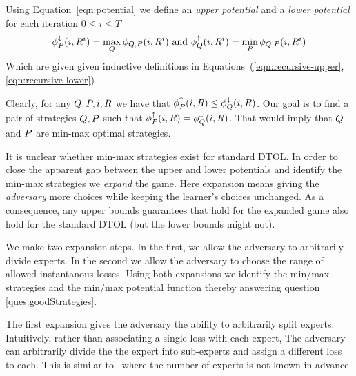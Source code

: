 \documentclass[12pt]{article} %
\begin{document}
Using Equation~\ref{eqn:potential} we define an {\em upper
  potential} and a {\em lower potential} for each iteration $0 \leq i
\leq T$
\begin{equation}
  \phi^{\downarrow}_P(i,R^i) = \max_Q \phi_{Q,P}(i,R^i) \mbox{ and }
  \phi^{\uparrow}_Q(i,R^i) = \min_P \phi_{Q,P}(i,R^i)
\end{equation}
Which are given given inductive definitions in Equations~(\ref{eqn:recursive-upper},\ref{eqn:recursive-lower})

Clearly, for any $Q,P, i, R$ we have that $\phi^{\uparrow}_P(i,R) \leq
\phi^{\downarrow}_Q(i,R)$. Our goal is to find a pair of strategies $Q,P$ such
that  $\phi^{\uparrow}_P(i,R) = \phi^{\downarrow}_Q(i,R)$. That would imply that
$Q$ and $P$ are min-max optimal strategies.

It is unclear whether min-max strategies exist for standard DTOL.
In order to close the apparent gap between the upper and lower
potentials and identify the min-max strategies we {\em expand} the game.
Here expansion means giving the {\em  adversary} more choices
while keeping the learner's choices unchanged. As a consequence, any
upper bounds guarantees that hold for the expanded game also hold for
the standard DTOL (but the lower bounds might not). 

We make two expansion steps. In the
first, we allow the adversary to arbitrarily divide experts. In the
second we allow the adversary to choose the range of allowed
instantanous losses. Using both expansions  we identify the min/max strategies
and the min/max potential function thereby answering question
\ref{ques:goodStrategies}.

The first expansion gives the adversary the ability to arbitrarily split
experts. Intuitively, rather than associating a single loss with each
expert, The adversary can arbitrarily divide the the expert into
sub-experts and assign a different loss to each. This is similar to~\cite{chernov2010prediction}
where the number of experts is not known in advance
\end{document}
